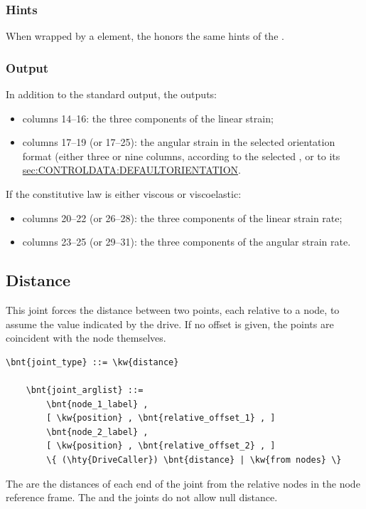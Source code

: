 \subsubsection{Hints}
When wrapped by a  element, the 
honors the same hints of the .

\subsubsection{Output}
In addition to the standard output, the 
outputs:
\begin{itemize}
\item columns 14--16: the three components of the linear strain;
\item columns 17--19 (or 17--25): the angular strain
in the selected orientation format (either three or nine columns,
according to the selected , or to its 
\hyperref{default value)}{default value, see Section~}{)}{sec:CONTROLDATA:DEFAULTORIENTATION}.
\end{itemize}
If the constitutive law is either viscous or viscoelastic:
\begin{itemize}
\item columns 20--22 (or 26--28): the three components
of the linear strain rate;
\item columns 23--25 (or 29--31): the three components
of the angular strain rate.
\end{itemize}




\subsection{Distance}
This joint forces the distance between two points,
each relative to a node, to assume the value indicated by the drive.
If no offset is given, the points are coincident with the node themselves.
\begin{Verbatim}[commandchars=\\\{\}]
    \bnt{joint_type} ::= \kw{distance}

    \bnt{joint_arglist} ::=
        \bnt{node_1_label} , 
        [ \kw{position} , \bnt{relative_offset_1} , ]
        \bnt{node_2_label} ,
        [ \kw{position} , \bnt{relative_offset_2} , ]
        \{ (\hty{DriveCaller}) \bnt{distance} | \kw{from nodes} \}
\end{Verbatim}
The  are the distances of each end
of the joint from the relative nodes in the node reference frame.
The  and the  joints
do not allow null distance.

